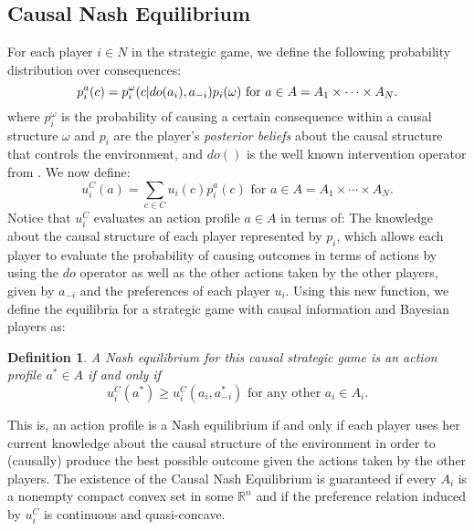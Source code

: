 \documentclass[review]{elsarticle}
\newtheorem{definition}[theorem]{Definition}
\begin{document}
\subsection{Causal Nash Equilibrium}
For each player $i \in N$ in the strategic game, we define the following probability distribution over consequences:
\begin{equation}{\label{causal_utility}}
p^a_i (c) =  p^\omega_i (c | do(a_i), a_{-i}) p_i(\omega)\textrm{ for } a \in A=A_1 \times \cdots \times A_N.
\end{equation}
where $p^\omega_i$ is the probability of causing a certain consequence within a causal structure $\omega$ and $p_i$ are the player's \textit{posterior beliefs} about the causal structure that controls the environment, and $do()$ is the well known intervention operator from \cite{pearl2009causality}. We now define:
\begin{equation}
u^C_i (a) = \sum_{c \in C}  u_i(c) p^a_i (c) \textrm{ for } a \in A=A_1 \times \cdots \times A_N.
\end{equation}
Notice that $u^C_i$ evaluates an action profile $a \in A$ in terms of: The knowledge about the causal structure of each player represented by $p_i$, which allows each player to evaluate the probability of causing outcomes in terms of actions by using the $do$ operator as well as the other actions taken by the other players, given by $a_{-i}$ and the preferences of each player $u_i$. Using this new function, we define the equilibria for a strategic game with causal information and Bayesian players as:
\begin{definition}
A Nash equilibrium for this \textit{causal strategic game} is an action profile $a^\ast \in A$ if and only if
\begin{equation}
 u^C_i(a^\ast) \geq u^C_i(a_i, a^\ast_{-i}) \textrm{ for any other } a_i \in A_i. 
 \end{equation}
\end{definition}
This is, an action profile is a Nash equilibrium if and only if each player uses her current knowledge about the causal structure of the environment in order to (causally) produce the best possible outcome given the actions taken by the other players. The existence of the Causal Nash Equilibrium is guaranteed if every $A_i$ is a nonempty compact convex set in some $\mathbb{R}^n$ and if the preference relation induced by $u^C_i$ is continuous and quasi-concave.
\end{document}
